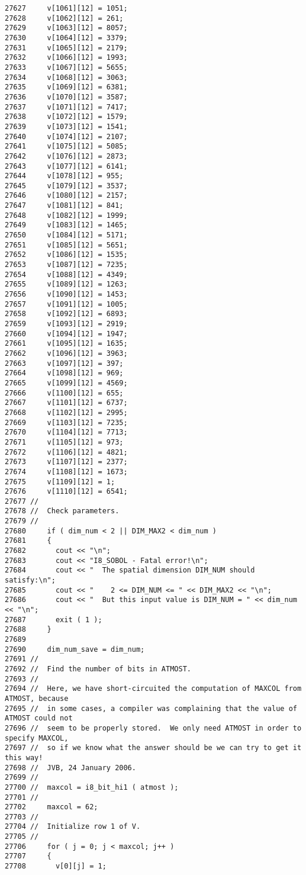 \begin{Code}
\begin{verbatim}
27627     v[1061][12] = 1051;
27628     v[1062][12] = 261;
27629     v[1063][12] = 8057;
27630     v[1064][12] = 3379;
27631     v[1065][12] = 2179;
27632     v[1066][12] = 1993;
27633     v[1067][12] = 5655;
27634     v[1068][12] = 3063;
27635     v[1069][12] = 6381;
27636     v[1070][12] = 3587;
27637     v[1071][12] = 7417;
27638     v[1072][12] = 1579;
27639     v[1073][12] = 1541;
27640     v[1074][12] = 2107;
27641     v[1075][12] = 5085;
27642     v[1076][12] = 2873;
27643     v[1077][12] = 6141;
27644     v[1078][12] = 955;
27645     v[1079][12] = 3537;
27646     v[1080][12] = 2157;
27647     v[1081][12] = 841;
27648     v[1082][12] = 1999;
27649     v[1083][12] = 1465;
27650     v[1084][12] = 5171;
27651     v[1085][12] = 5651;
27652     v[1086][12] = 1535;
27653     v[1087][12] = 7235;
27654     v[1088][12] = 4349;
27655     v[1089][12] = 1263;
27656     v[1090][12] = 1453;
27657     v[1091][12] = 1005;
27658     v[1092][12] = 6893;
27659     v[1093][12] = 2919;
27660     v[1094][12] = 1947;
27661     v[1095][12] = 1635;
27662     v[1096][12] = 3963;
27663     v[1097][12] = 397;
27664     v[1098][12] = 969;
27665     v[1099][12] = 4569;
27666     v[1100][12] = 655;
27667     v[1101][12] = 6737;
27668     v[1102][12] = 2995;
27669     v[1103][12] = 7235;
27670     v[1104][12] = 7713;
27671     v[1105][12] = 973;
27672     v[1106][12] = 4821;
27673     v[1107][12] = 2377;
27674     v[1108][12] = 1673;
27675     v[1109][12] = 1;
27676     v[1110][12] = 6541;
27677 //
27678 //  Check parameters.
27679 //
27680     if ( dim_num < 2 || DIM_MAX2 < dim_num )
27681     {
27682       cout << "\n";
27683       cout << "I8_SOBOL - Fatal error!\n";
27684       cout << "  The spatial dimension DIM_NUM should satisfy:\n";
27685       cout << "    2 <= DIM_NUM <= " << DIM_MAX2 << "\n";
27686       cout << "  But this input value is DIM_NUM = " << dim_num << "\n";
27687       exit ( 1 );
27688     }
27689 
27690     dim_num_save = dim_num;
27691 //
27692 //  Find the number of bits in ATMOST.
27693 //
27694 //  Here, we have short-circuited the computation of MAXCOL from ATMOST, because
27695 //  in some cases, a compiler was complaining that the value of ATMOST could not
27696 //  seem to be properly stored.  We only need ATMOST in order to specify MAXCOL,
27697 //  so if we know what the answer should be we can try to get it this way!
27698 //  JVB, 24 January 2006.
27699 //
27700 //  maxcol = i8_bit_hi1 ( atmost );
27701 //
27702     maxcol = 62;
27703 //
27704 //  Initialize row 1 of V.
27705 //
27706     for ( j = 0; j < maxcol; j++ )
27707     {
27708       v[0][j] = 1;

\end{verbatim}
\end{Code}
